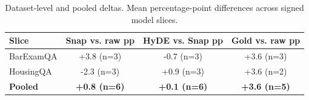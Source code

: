 \begin{table}[H]
\centering
\caption{Dataset-level and pooled deltas. Mean percentage-point differences across signed model slices.}
\label{tab:result_anatomy}
\small
\begin{tabular}{lccc}
\toprule
Slice & Snap vs. raw pp & HyDE vs. Snap pp & Gold vs. raw pp \\
\midrule
BarExamQA & +3.8 (n=3) & -0.7 (n=3) & +3.6 (n=3) \\
HousingQA & -2.3 (n=3) & +0.9 (n=3) & +3.6 (n=2) \\
\midrule
\textbf{Pooled} & \textbf{+0.8 (n=6)} & \textbf{+0.1 (n=6)} & \textbf{+3.6 (n=5)} \\
\bottomrule
\end{tabular}
\end{table}
